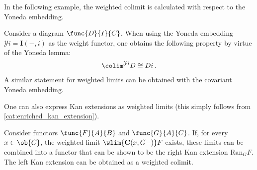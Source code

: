     In the following example, the weighted colimit is calculated with respect to the Yoneda embedding.
    \begin{example}
        Consider a diagram $\func{D}{I}{C}$. When using the Yoneda embedding $\mathcal{Y}i = \mathbf{I}(-,i)$ as the weight functor, one obtains the following property by virtue of the Yoneda lemma:
        \begin{gather}
            \label{cat:weighted_hom_colimit}
            \colim^{\mathcal{Y}i}D\cong Di\,.
        \end{gather}
        A similar statement for weighted limits can be obtained with the covariant Yoneda embedding.
    \end{example}

    One can also express Kan extensions as weighted limits (this simply follows from \cref{cat:enriched_kan_extension}).
    \begin{property}
        Consider functors $\func{F}{A}{B}$ and $\func{G}{A}{C}$. If, for every $x\in\ob{C}$, the weighted limit $\wlim{\mathbf{C}(x,G-)}F$ exists, these limits can be combined into a functor that can be shown to be the right Kan extension $\mathrm{Ran}_GF$. The left Kan extension can be obtained as a weighted colimit.
    \end{property}

